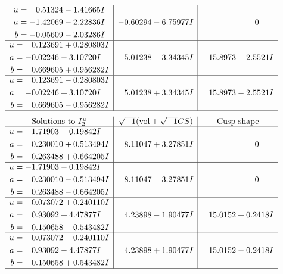 \documentclass[1p]{elsarticle_modified}
\theoremstyle{definition}
\newcommand{\I}{\sqrt{-1}}
\begin{document}
$$\begin{array}{c|c|c}
\begin{aligned}
u &= \phantom{-}0.51324 - 1.41665 I \\
a &= -1.42069 - 2.22836 I \\
b &= -0.05609 - 2.03286 I\end{aligned}
 & -0.60294 - 6.75977 I & \phantom{-0.000000 } 0 \\ \hline\begin{aligned}
u &= \phantom{-}0.123691 + 0.280803 I \\
a &= -0.02246 - 3.10720 I \\
b &= \phantom{-}0.669605 + 0.956282 I\end{aligned}
 & \phantom{-}5.01238 - 3.34345 I & \phantom{-}15.8973 + 2.5521 I \\ \hline\begin{aligned}
u &= \phantom{-}0.123691 - 0.280803 I \\
a &= -0.02246 + 3.10720 I \\
b &= \phantom{-}0.669605 - 0.956282 I\end{aligned}
 & \phantom{-}5.01238 + 3.34345 I & \phantom{-}15.8973 - 2.5521 I\\
 \hline 
 \end{array}$$\newpage$$\begin{array}{c|c|c}  
\text{Solutions to }I^u_{2}& \I (\text{vol} + \sqrt{-1}CS) & \text{Cusp shape}\\
 \hline 
\begin{aligned}
u &= -1.71903 + 0.19842 I \\
a &= \phantom{-}0.230010 + 0.513494 I \\
b &= \phantom{-}0.263488 + 0.664205 I\end{aligned}
 & \phantom{-}8.11047 + 3.27851 I & \phantom{-0.000000 } 0 \\ \hline\begin{aligned}
u &= -1.71903 - 0.19842 I \\
a &= \phantom{-}0.230010 - 0.513494 I \\
b &= \phantom{-}0.263488 - 0.664205 I\end{aligned}
 & \phantom{-}8.11047 - 3.27851 I & \phantom{-0.000000 } 0 \\ \hline\begin{aligned}
u &= \phantom{-}0.073072 + 0.240110 I \\
a &= \phantom{-}0.93092 + 4.47877 I \\
b &= \phantom{-}0.150658 - 0.543482 I\end{aligned}
 & \phantom{-}4.23898 - 1.90477 I & \phantom{-}15.0152 + 0.2418 I \\ \hline\begin{aligned}
u &= \phantom{-}0.073072 - 0.240110 I \\
a &= \phantom{-}0.93092 - 4.47877 I \\
b &= \phantom{-}0.150658 + 0.543482 I\end{aligned}
 & \phantom{-}4.23898 + 1.90477 I & \phantom{-}15.0152 - 0.2418 I\\
 \hline 
 \end{array}$$\newpage
\end{document}
